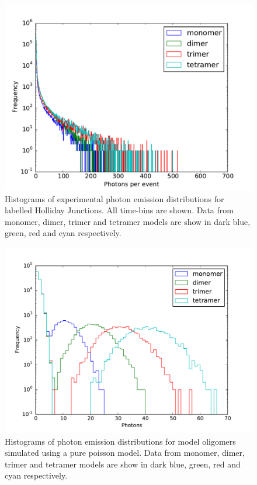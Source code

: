 \begin{figure}
   \begin{center}
      \includegraphics*[clip=true, width=6in]{sizing/Holliday_Junctions.pdf}
      \caption{Histograms of experimental photon emission distributions for labelled Holliday Junctions. All time-bins are shown. Data from monomer, dimer, trimer and tetramer models are show in dark blue, green, red and cyan respectively.}
      \label{fig:HJ_oligomers}
   \end{center}
\end{figure}

\begin{figure}
   \begin{center}
      \includegraphics*[clip=true, width=6in]{sizing/poisson_oligomers_log.pdf}
      \caption{Histograms of photon emission distributions for model oligomers simulated using a pure poisson model. Data from monomer, dimer, trimer and tetramer models are show in dark blue, green, red and cyan respectively.}
      \label{fig:poisson_oligomers}
   \end{center}
\end{figure}


